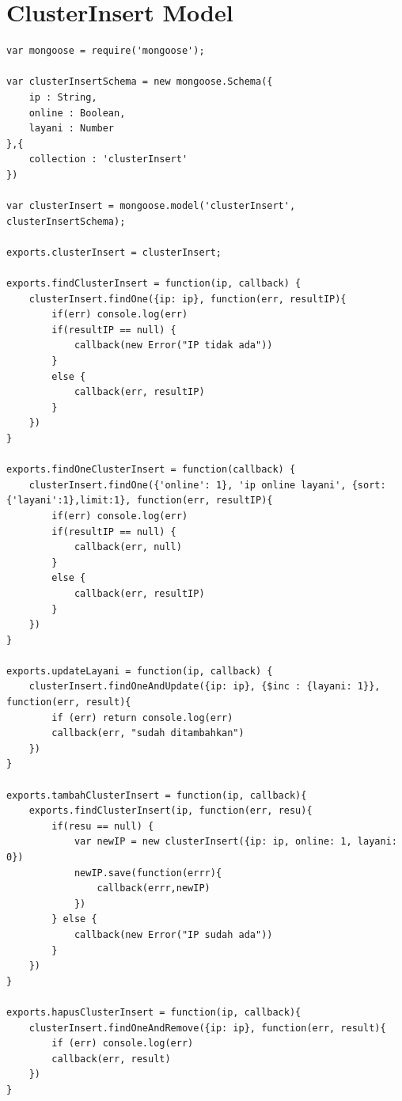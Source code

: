 \documentclass{ta-its}
\begin{document}
		\section{ClusterInsert Model}
			\begin{lstlisting}[frame=single,tabsize=2,breaklines,caption={ClusterInsert Model untuk Koleksi ClusterInsert},label=clusterInsertModel]	
var mongoose = require('mongoose');

var clusterInsertSchema = new mongoose.Schema({
	ip : String,
	online : Boolean,
	layani : Number
},{
	collection : 'clusterInsert'
})

var clusterInsert = mongoose.model('clusterInsert', clusterInsertSchema);

exports.clusterInsert = clusterInsert;

exports.findClusterInsert = function(ip, callback) {
	clusterInsert.findOne({ip: ip}, function(err, resultIP){
		if(err) console.log(err)
		if(resultIP == null) {
			callback(new Error("IP tidak ada"))
		}
		else {
			callback(err, resultIP)
		}
	})
}

exports.findOneClusterInsert = function(callback) {
	clusterInsert.findOne({'online': 1}, 'ip online layani', {sort:{'layani':1},limit:1}, function(err, resultIP){
		if(err) console.log(err)
		if(resultIP == null) {
			callback(err, null)
		}
		else {
			callback(err, resultIP)
		}
	})
}

exports.updateLayani = function(ip, callback) {
	clusterInsert.findOneAndUpdate({ip: ip}, {$inc : {layani: 1}}, function(err, result){
		if (err) return console.log(err)
		callback(err, "sudah ditambahkan")
	})
}

exports.tambahClusterInsert = function(ip, callback){
	exports.findClusterInsert(ip, function(err, resu){
		if(resu == null) {
			var newIP = new clusterInsert({ip: ip, online: 1, layani: 0})
			newIP.save(function(errr){
				callback(errr,newIP)
			})
		} else {
			callback(new Error("IP sudah ada"))
		}
	})
}

exports.hapusClusterInsert = function(ip, callback){
	clusterInsert.findOneAndRemove({ip: ip}, function(err, result){
		if (err) console.log(err)
		callback(err, result)
	})
}
			
			\end{lstlisting}
		
\end{document}
